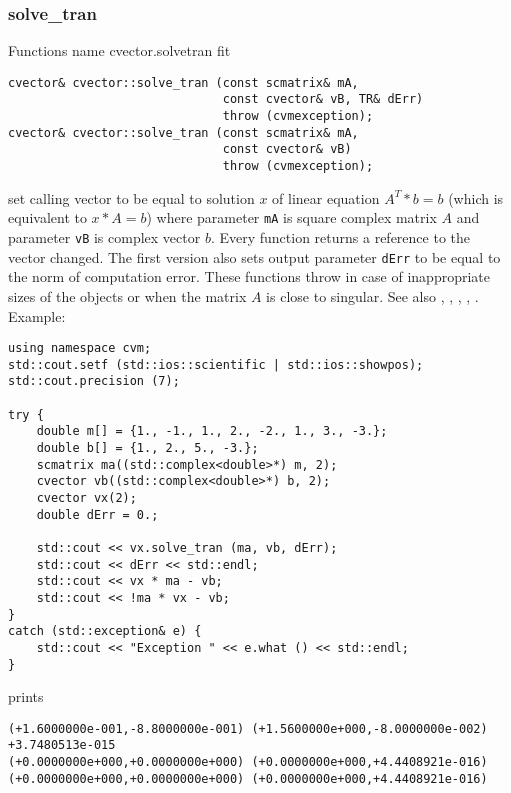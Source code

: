 \subsubsection{solve\_tran}
Functions%
\pdfdest name {cvector.solvetran} fit
\begin{verbatim}
cvector& cvector::solve_tran (const scmatrix& mA,
                              const cvector& vB, TR& dErr)
                              throw (cvmexception);
cvector& cvector::solve_tran (const scmatrix& mA,
                              const cvector& vB)
                              throw (cvmexception);
\end{verbatim}
set calling vector to be equal to solution $x$ of linear equation
$A^T*b=b$ (which is equivalent to $x*A=b$) 
where parameter \verb"mA" is  square complex matrix $A$
and parameter \verb"vB" is  complex vector $b$.
Every function returns a reference to the vector changed.
The first version also sets output parameter \verb"dErr" to be equal
to the norm of computation error.
These functions throw 
in case of inappropriate sizes
of the objects or when the matrix $A$ is close to singular.
See also , 
, ,
, .
Example:
\begin{Verbatim}
using namespace cvm;
std::cout.setf (std::ios::scientific | std::ios::showpos);
std::cout.precision (7);

try {
    double m[] = {1., -1., 1., 2., -2., 1., 3., -3.};
    double b[] = {1., 2., 5., -3.};
    scmatrix ma((std::complex<double>*) m, 2);
    cvector vb((std::complex<double>*) b, 2);
    cvector vx(2);
    double dErr = 0.;

    std::cout << vx.solve_tran (ma, vb, dErr);
    std::cout << dErr << std::endl;
    std::cout << vx * ma - vb;
    std::cout << !ma * vx - vb;
}
catch (std::exception& e) {
    std::cout << "Exception " << e.what () << std::endl;
}
\end{Verbatim}
prints
\begin{Verbatim}
(+1.6000000e-001,-8.8000000e-001) (+1.5600000e+000,-8.0000000e-002)
+3.7480513e-015
(+0.0000000e+000,+0.0000000e+000) (+0.0000000e+000,+4.4408921e-016)
(+0.0000000e+000,+0.0000000e+000) (+0.0000000e+000,+4.4408921e-016)
\end{Verbatim}
\newpage




